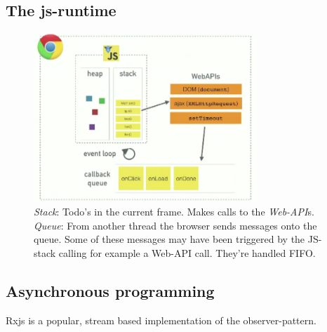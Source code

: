 \subsection{The js-runtime}
\begin{figure}[H] \label{js-runtime}
    \caption{\emph{Stack}: Todo's in the current frame. Makes calls to the \emph{Web-API}s. \emph{Queue}: From another thread the browser sends messages onto the queue. Some of these messages may have been triggered by the JS-stack calling for example a  Web-API call. They're handled FIFO.}
    \centering
    \includegraphics[width=0.75\textwidth]{images/js_event_loop.png}
\end{figure}

\subsection{Asynchronous programming}

Rxjs is a popular, stream based implementation of the observer-pattern.

